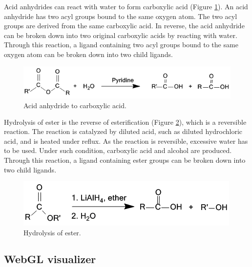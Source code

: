 Acid anhydrides can react with water to form carboxylic acid (Figure \ref{isyn:AcidAnhydrideReaction}). An acid anhydride has two acyl groups bound to the same oxygen atom. The two acyl groups are derived from the same carboxylic acid. In reverse, the acid anhydride can be broken down into two original carboxylic acids by reacting with water. Through this reaction, a ligand containing two acyl groups bound to the same oxygen atom can be broken down into two child ligands.

\begin{figure}
\begin{center}
\includegraphics[width=\linewidth]{../isyn/AcidAnhydrideReaction.png}
\end{center}
\caption{Acid anhydride to carboxylic acid.}
\label{isyn:AcidAnhydrideReaction}
\end{figure}

Hydrolysis of ester is the reverse of esterification (Figure \ref{isyn:EsterHydrolysis}), which is a reversible reaction. The reaction is catalyzed by diluted acid, such as diluted hydrochloric acid, and is heated under reflux. As the reaction is reversible, excessive water has to be used. Under such condition, carboxylic acid and alcohol are produced. Through this reaction, a ligand containing ester groups can be broken down into two child ligands.

\begin{figure}
\begin{center}
\includegraphics[width=\linewidth]{../isyn/EsterHydrolysis.png}
\end{center}
\caption{Hydrolysis of ester.}
\label{isyn:EsterHydrolysis}
\end{figure}

\subsection{WebGL visualizer}

